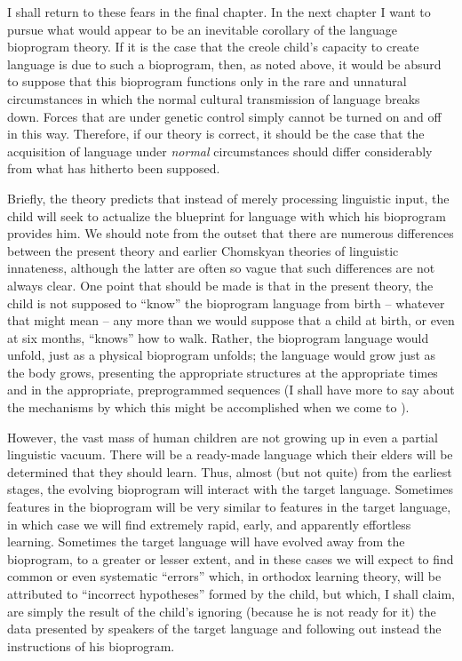 I shall return to these fears in the final chapter. In the next chapter I want to pursue what would appear to be an inevitable corollary of the language bioprogram theory. If it is the case that the creole child's capacity to create language is due to such a bioprogram, then, as noted above, it would be absurd to suppose that this bioprogram functions only in the rare and unnatural circumstances in which the normal cultural transmission of language breaks down. Forces that are under genetic control simply cannot be turned on and off in this way. Therefore, if our theory is correct, it should be the case that the acquisition of language under \textit{normal} circumstances should differ considerably from what has hitherto been supposed.

Briefly, the theory predicts that instead of merely processing linguistic input, the child will seek to actualize the blueprint for language with which his bioprogram provides him. We should note from the outset that there are numerous differences between the present theory and earlier Chomskyan theories of linguistic innateness, although the latter are often so vague that such differences are not always clear. One point that should be made is that in the present theory, the child is not supposed to ``know'' the bioprogram language from birth -- whatever that might mean -- any more than we would suppose that a child at birth, or even at six months, ``knows'' how to walk.
Rather, the bioprogram language would unfold, just as a physical bioprogram unfolds; the language would grow just as the body grows, presenting the appropriate structures at the appropriate times and in the appropriate, preprogrammed sequences (I shall have more to say about the mechanisms by which this might be accomplished when we come to ).

However, the vast mass of human children are not growing up in even a partial linguistic vacuum. There will be a ready-made language which their elders will be determined that they should learn. Thus, almost (but not quite) from the earliest stages, the evolving bioprogram will interact with the target language. Sometimes features in the bioprogram will be very similar to features in the target language, in which case we will find extremely rapid, early, and apparently effortless learning. Sometimes the target language will have evolved away from the bioprogram, to a greater or lesser extent, and in these cases we will expect to find common or even systematic ``errors'' which, in orthodox learning theory, will be attributed to ``incorrect hypotheses'' formed by the child, but which, I shall claim, are simply the result of the child's ignoring (because he is not ready for it) the data presented by speakers of the target language and following out instead the instructions of his bioprogram.
 

